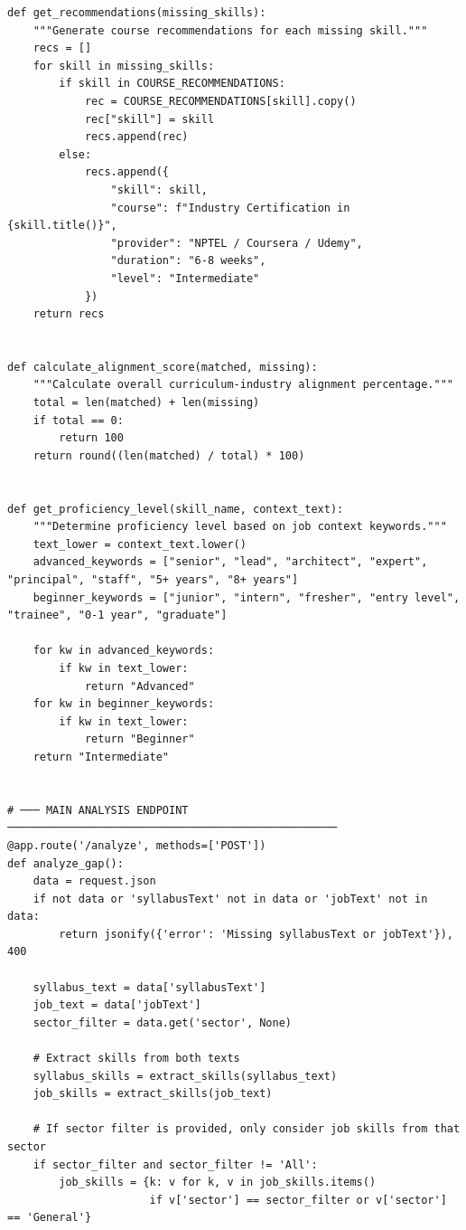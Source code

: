 \documentclass[12pt,a4paper]{report}
\begin{document}
\begin{verbatim}
def get_recommendations(missing_skills):
    """Generate course recommendations for each missing skill."""
    recs = []
    for skill in missing_skills:
        if skill in COURSE_RECOMMENDATIONS:
            rec = COURSE_RECOMMENDATIONS[skill].copy()
            rec["skill"] = skill
            recs.append(rec)
        else:
            recs.append({
                "skill": skill,
                "course": f"Industry Certification in {skill.title()}",
                "provider": "NPTEL / Coursera / Udemy",
                "duration": "6-8 weeks",
                "level": "Intermediate"
            })
    return recs


def calculate_alignment_score(matched, missing):
    """Calculate overall curriculum-industry alignment percentage."""
    total = len(matched) + len(missing)
    if total == 0:
        return 100
    return round((len(matched) / total) * 100)


def get_proficiency_level(skill_name, context_text):
    """Determine proficiency level based on job context keywords."""
    text_lower = context_text.lower()
    advanced_keywords = ["senior", "lead", "architect", "expert", "principal", "staff", "5+ years", "8+ years"]
    beginner_keywords = ["junior", "intern", "fresher", "entry level", "trainee", "0-1 year", "graduate"]

    for kw in advanced_keywords:
        if kw in text_lower:
            return "Advanced"
    for kw in beginner_keywords:
        if kw in text_lower:
            return "Beginner"
    return "Intermediate"


# ─── MAIN ANALYSIS ENDPOINT ───────────────────────────────────────────────────
@app.route('/analyze', methods=['POST'])
def analyze_gap():
    data = request.json
    if not data or 'syllabusText' not in data or 'jobText' not in data:
        return jsonify({'error': 'Missing syllabusText or jobText'}), 400

    syllabus_text = data['syllabusText']
    job_text = data['jobText']
    sector_filter = data.get('sector', None)

    # Extract skills from both texts
    syllabus_skills = extract_skills(syllabus_text)
    job_skills = extract_skills(job_text)

    # If sector filter is provided, only consider job skills from that sector
    if sector_filter and sector_filter != 'All':
        job_skills = {k: v for k, v in job_skills.items()
                      if v['sector'] == sector_filter or v['sector'] == 'General'}


\end{verbatim}
\end{document}
